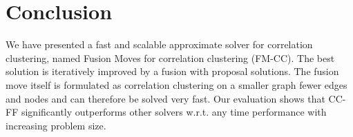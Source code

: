 \documentclass[10pt,twocolumn,letterpaper]{article}
\theoremstyle{definition}
\begin{document}
\section{Conclusion}\label{sec:conclusion}

We have presented a fast and scalable 
approximate solver for correlation 
clustering, named Fusion Moves for correlation clustering (FM-CC).
The best solution is iteratively improved 
by a fusion with proposal solutions.
The fusion move itself is formulated as correlation
clustering on a smaller graph fewer edges and nodes
and can therefore be solved very fast.
Our evaluation shows that CC-FF
significantly outperforms 
other solvers w.r.t. any time performance 
with increasing problem size.


    


\newpage

\FloatBarrier
{\small


}



% 
% 
% 
% 
% 
% 
% 
\end{document}
